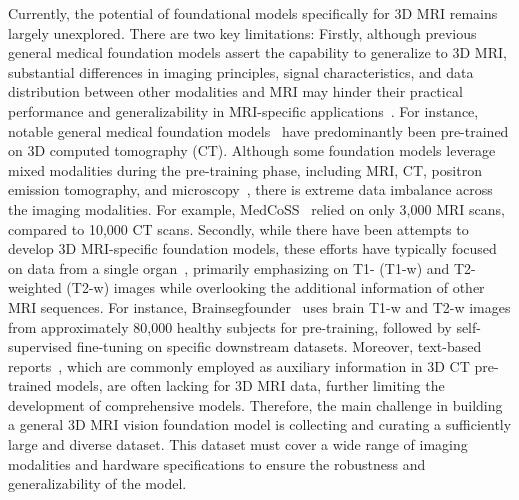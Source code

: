 Currently, the potential of foundational models specifically for 3D MRI remains largely unexplored. There are two key limitations:
Firstly, although previous general medical foundation models assert the capability to generalize to 3D MRI, substantial differences in imaging principles, signal characteristics, and data distribution between other modalities and MRI may hinder their practical performance and generalizability in MRI-specific applications~\cite{perez2021torchio,cardoso2022monai,https://doi.org/10.1002/mp.17675}. For instance, notable general medical foundation models~\cite{wu2024voco,li2024well,tang2022self} have predominantly been pre-trained on 3D computed tomography (CT). Although some foundation models leverage mixed modalities during the pre-training phase, including MRI, CT, positron emission tomography, and microscopy~\cite{ye2024continual,gao2024training,isensee2021nnu}, there is extreme data imbalance across the imaging modalities. For example, MedCoSS~\cite{ye2024continual} relied on only 3,000 MRI scans, compared to 10,000 CT scans.
Secondly, while there have been attempts to develop 3D MRI-specific foundation models, these efforts have typically focused on data from a single organ~\cite{cox2024brainsegfounder, kim2023empirical}, primarily emphasizing on T1- (T1-w) and T2-weighted (T2-w) images while overlooking the additional information of other MRI sequences. For instance, Brainsegfounder~\cite{cox2024brainsegfounder} uses brain T1-w and T2-w images from approximately 80,000 healthy subjects for pre-training, followed by self-supervised fine-tuning on specific downstream datasets. Moreover, text-based reports~\cite{blankemeier2024merlin,zhang2024generalist}, which are commonly employed as auxiliary information in 3D CT pre-trained models, are often lacking for 3D MRI data, further limiting the development of comprehensive models.
Therefore, the main challenge in building a general 3D MRI vision foundation model is collecting and curating a sufficiently large and diverse dataset. This dataset must cover a wide range of imaging modalities and hardware specifications to ensure the robustness and generalizability of the model.

